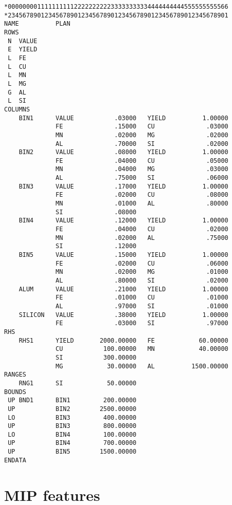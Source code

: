 \begin{verbatim}
*000000001111111111222222222233333333334444444444555555555566
*234567890123456789012345678901234567890123456789012345678901
NAME          PLAN
ROWS
 N  VALUE
 E  YIELD
 L  FE
 L  CU
 L  MN
 L  MG
 G  AL
 L  SI
COLUMNS
    BIN1      VALUE           .03000   YIELD          1.00000
              FE              .15000   CU              .03000
              MN              .02000   MG              .02000
              AL              .70000   SI              .02000
    BIN2      VALUE           .08000   YIELD          1.00000
              FE              .04000   CU              .05000
              MN              .04000   MG              .03000
              AL              .75000   SI              .06000
    BIN3      VALUE           .17000   YIELD          1.00000
              FE              .02000   CU              .08000
              MN              .01000   AL              .80000
              SI              .08000
    BIN4      VALUE           .12000   YIELD          1.00000
              FE              .04000   CU              .02000
              MN              .02000   AL              .75000
              SI              .12000
    BIN5      VALUE           .15000   YIELD          1.00000
              FE              .02000   CU              .06000
              MN              .02000   MG              .01000
              AL              .80000   SI              .02000
    ALUM      VALUE           .21000   YIELD          1.00000
              FE              .01000   CU              .01000
              AL              .97000   SI              .01000
    SILICON   VALUE           .38000   YIELD          1.00000
              FE              .03000   SI              .97000
RHS
    RHS1      YIELD       2000.00000   FE            60.00000
              CU           100.00000   MN            40.00000
              SI           300.00000
              MG            30.00000   AL          1500.00000
RANGES
    RNG1      SI            50.00000
BOUNDS
 UP BND1      BIN1         200.00000
 UP           BIN2        2500.00000
 LO           BIN3         400.00000
 UP           BIN3         800.00000
 LO           BIN4         100.00000
 UP           BIN4         700.00000
 UP           BIN5        1500.00000
ENDATA
\end{verbatim}

\section{MIP features}

